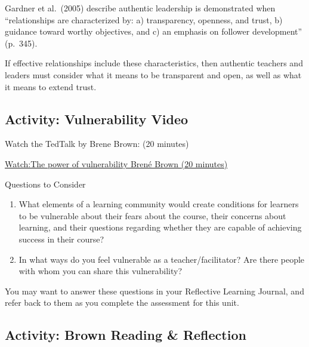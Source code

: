 \documentclass[
]{book}
\providecommand{\tightlist}{%
  \setlength{\itemsep}{0pt}\setlength{\parskip}{0pt}}
\begin{document}
Gardner et al.~(2005) describe authentic leadership is demonstrated when ``relationships are characterized by: a) transparency, openness, and trust, b) guidance toward worthy objectives, and c) an emphasis on follower development'' (p.~345).

If effective relationships include these characteristics, then authentic teachers and leaders must consider what it means to be transparent and open, as well as what it means to extend trust.

\hypertarget{activity-vulnerability-video}{%
\subsection*{Activity: Vulnerability Video}\label{activity-vulnerability-video}}

\begin{reflect}
Watch the TedTalk by Brene Brown: (20 minutes)

\href{https://www.youtube.com/watch?v=iCvmsMzlF7o}{Watch:The power of vulnerability \textbar{} Brené Brown (20 minutes)}

{Questions to Consider}

\begin{enumerate}
\def\labelenumi{\arabic{enumi}.}
\tightlist
\item
  What elements of a learning community would create conditions for learners to be vulnerable about their fears about the course, their concerns about learning, and their questions regarding whether they are capable of achieving success in their course?\\
\item
  In what ways do you feel vulnerable as a teacher/facilitator? Are there people with whom you can share this vulnerability?
\end{enumerate}

You may want to answer these questions in your Reflective Learning Journal, and refer back to them as you complete the assessment for this unit.
\end{reflect}

\hypertarget{activity-brown-reading-reflection}{%
\subsection*{Activity: Brown Reading \& Reflection}\label{activity-brown-reading-reflection}}
\end{document}

